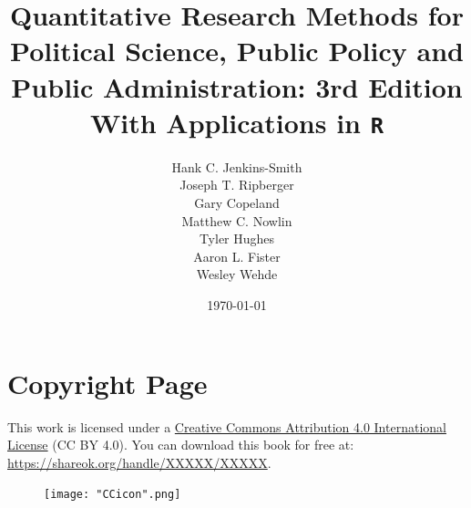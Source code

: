 \documentclass[11pt,openany]{book}\usepackage[]{graphicx}\usepackage[]{color}
\begin{document}
\title{Quantitative Research Methods for Political Science, Public Policy and Public Administration: 3rd Edition\\
  \LARGE With Applications in \texttt{R}}

\author{Hank C. Jenkins-Smith\\ 
Joseph T. Ripberger\\
Gary Copeland\\
Matthew C. Nowlin\\
Tyler Hughes\\
Aaron L. Fister\\
Wesley Wehde}

\date{\today}

\maketitle



\newpage
\chapter*{Copyright Page}

This work is licensed under a \href{https://creativecommons.org/licenses/by/4.0/}{Creative Commons Attribution 4.0 International License} (CC BY 4.0). You can download this book for free at: \url{https://shareok.org/handle/XXXXX/XXXXX}.  

\begin{figure}[h]
\centerline{\texttt{[image: "CCicon".png]}}
\label{fig:cc}
\end{figure}


{\singlespacing
  \tableofcontents
  
  \listoftables
  }



\newpage
\end{document}
